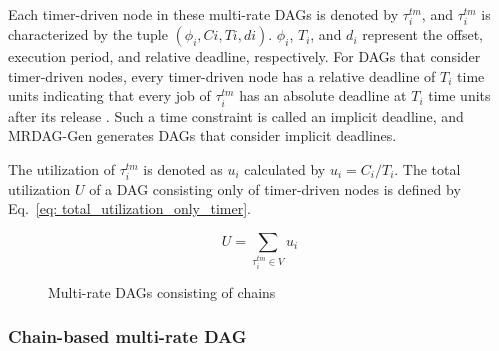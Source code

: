 Each timer-driven node in these multi-rate DAGs is denoted by $\tau^{tm}_i$, and $\tau^{tm}_i$ is characterized by the tuple $(\phi_i, Ci, Ti, di)$.
$\phi_i$, $T_i$, and $d_i$ represent the offset, execution period, and relative deadline, respectively.
For DAGs that consider timer-driven nodes, every timer-driven node has a relative deadline of $T_i$ time units indicating that every job of $\tau^{tm}_i$ has an absolute deadline at $T_i$ time units after its release \cite{yang2020mixed, cho2021conditionally}.
Such a time constraint is called an implicit deadline, and MRDAG-Gen generates DAGs that consider implicit deadlines.

The utilization of $\tau^{tm}_i$ is denoted as $u_i$ calculated by $u_i = C_i / T_i$.
The total utilization $U$ of a DAG consisting only of timer-driven nodes is defined by Eq.~\ref{eq: total_utilization_only_timer}.

\begin{equation}
    \label{eq: total_utilization_only_timer}
    U = \sum_{\tau^{tm}_i \in V}u_i
\end{equation}


\begin{figure}[tb]
    \centering
    \caption{Multi-rate DAGs consisting of chains}
    \label{fig: chain_dag}
\end{figure}


\subsubsection{Chain-based multi-rate DAG}
\label{sssec: dag_chain}

